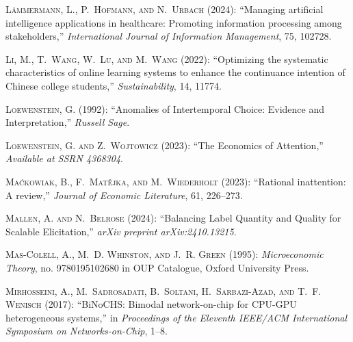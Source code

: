 \begin{thebibliography}{1}
\textsc{L{\"a}mmermann, L., P.~Hofmann, and N.~Urbach} (2024): \enquote{Managing artificial intelligence applications in healthcare: Promoting information processing among stakeholders,} \emph{International Journal of Information Management}, 75, 102728.

\textsc{Li, M., T.~Wang, W.~Lu, and M.~Wang} (2022): \enquote{Optimizing the systematic characteristics of online learning systems to enhance the continuance intention of Chinese college students,} \emph{Sustainability}, 14, 11774.

\textsc{Loewenstein, G.} (1992): \enquote{Anomalies of Intertemporal Choice: Evidence and Interpretation,} \emph{Russell Sage}.

\textsc{Loewenstein, G. and Z.~Wojtowicz} (2023): \enquote{The Economics of Attention,} \emph{Available at SSRN 4368304}.

\textsc{Ma{\'c}kowiak, B., F.~Mat{\v{e}}jka, and M.~Wiederholt} (2023): \enquote{Rational inattention: A review,} \emph{Journal of Economic Literature}, 61, 226--273.

\textsc{Mallen, A. and N.~Belrose} (2024): \enquote{Balancing Label Quantity and Quality for Scalable Elicitation,} \emph{arXiv preprint arXiv:2410.13215}.

\textsc{Mas-Colell, A., M.~D. Whinston, and J.~R. Green} (1995): \emph{{Microeconomic Theory}}, no. 9780195102680 in OUP Catalogue, Oxford University Press.

\textsc{Mirhosseini, A., M.~Sadrosadati, B.~Soltani, H.~Sarbazi-Azad, and T.~F. Wenisch} (2017): \enquote{BiNoCHS: Bimodal network-on-chip for CPU-GPU heterogeneous systems,} in \emph{Proceedings of the Eleventh IEEE/ACM International Symposium on Networks-on-Chip}, 1--8.


\end{thebibliography}
